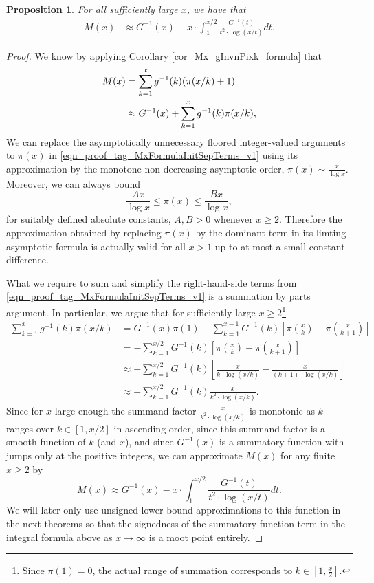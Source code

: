 \documentclass[11pt,reqno,a4letter]{article}
\numberwithin{figure}{section}
\numberwithin{table}{section}
\theoremstyle{plain}
\newtheorem{prop}[theorem]{Proposition}
\numberwithin{theorem}{section}
\theoremstyle{definition}
\begin{document}
\begin{prop}
\label{prop_Mx_SBP_IntegralFormula} 
For all sufficiently large $x$, we have that 
\begin{align} 
\label{eqn_pf_tag_v2-restated_v2} 
M(x) & \approx G^{-1}(x) - x \cdot \int_1^{x/2} \frac{G^{-1}(t)}{t^2 \cdot \log(x/t)} dt. 
\end{align} 
\end{prop} 
\begin{proof} 
We know by applying Corollary \ref{cor_Mx_gInvnPixk_formula} that 
\begin{align} 
\notag
M(x) & = \sum_{k=1}^{x} g^{-1}(k) (\pi(x/k)+1) \\ 
\label{eqn_proof_tag_MxFormulaInitSepTerms_v1} 
     & \approx G^{-1}(x) + \sum_{k=1}^{x} g^{-1}(k) \pi(x/k), 
\end{align} 
We can replace the asymptotically unnecessary floored integer-valued arguments to $\pi(x)$ 
in \eqref{eqn_proof_tag_MxFormulaInitSepTerms_v1} using 
its approximation by the monotone non-decreasing asymptotic order, $\pi(x) \sim \frac{x}{\log x}$. 
Moreover, we can always 
bound $$\frac{Ax}{\log x} \leq \pi(x) \leq \frac{Bx}{\log x},$$ for suitably defined 
absolute constants, $A,B > 0$ whenever $x \geq 2$. 
Therefore the approximation obtained by replacing $\pi(x)$ by the dominant term in its 
limting asymptotic formula is actually valid for all $x > 1$ up to at most 
a small constant difference. 

What we require to sum and simplify the right-hand-side terms from 
\eqref{eqn_proof_tag_MxFormulaInitSepTerms_v1} is a summation by parts argument. 
In particular, we argue that for sufficiently large 
$x \geq 2$\footnote{
     Since $\pi(1) = 0$, the actual range of summation corresponds to 
     $k \in \left[1, \frac{x}{2}\right]$. 
}
\begin{align*} 
\sum_{k=1}^{x} g^{-1}(k) \pi(x/k) & = G^{-1}(x) \pi(1) - \sum_{k=1}^{x-1} G^{-1}(k) \left[ 
     \pi\left(\frac{x}{k}\right) - \pi\left(\frac{x}{k+1}\right)\right] \\ 
     & = -\sum_{k=1}^{x/2} G^{-1}(k) \left[ 
     \pi\left(\frac{x}{k}\right) - \pi\left(\frac{x}{k+1}\right)\right] \\ 
     & \approx -\sum_{k=1}^{x/2} G^{-1}(k) \left[ 
     \frac{x}{k \cdot \log(x/k)} - \frac{x}{(k+1) \cdot \log(x/k)}\right] \\ 
     & \approx -\sum_{k=1}^{x/2} G^{-1}(k) \frac{x}{k^2 \cdot \log(x/k)}. 
\end{align*} 
Since for $x$ large enough the summand factor $\frac{x}{k^2 \cdot \log(x/k)}$ 
is monotonic as $k$ ranges over $k \in [1, x/2]$ in ascending order, since this 
summand factor is a smooth function of $k$ (and $x$), and since $G^{-1}(x)$ is 
a summatory function with jumps only at the positive integers, we can approximate 
$M(x)$ for any finite $x \geq 2$ by 
\[
M(x) \approx G^{-1}(x) - x \cdot \int_1^{x/2} \frac{G^{-1}(t)}{t^2 \cdot \log(x/t)} dt. 
\]
We will later only use unsigned lower bound approximations to this function in the next theorems so that 
the signedness of the summatory function term in the integral formula above 
as $x \rightarrow \infty$ is a moot point entirely. 
\end{proof} 
\end{document}
